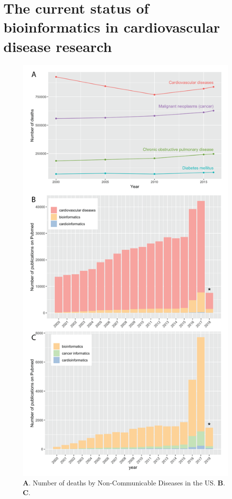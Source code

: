 \documentclass{bioinfo}
\begin{document}
\section{The current status of bioinformatics in cardiovascular disease research}
\begin{figure}
	\centering
	\includegraphics[width=1\linewidth]{figure1}
	\caption{\textbf{A}. Number of deaths by Non-Communicable Diseases in the US. \textbf{B}. \textbf{C}.}
	\label{fig:figure1}
\end{figure}
\end{document}
